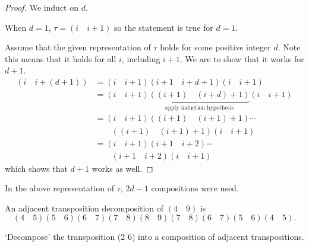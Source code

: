\begin{proof}
    We induct on $d$.

    When $d = 1$, $\tau = (i\quad i+1)$ so the statement is true for $d=1$.

    Assume that the given representation of $\tau$ holds for some positive integer $d$. Note this means that it holds for all $i$, including $i+1$. We are to show that it works for $d + 1$.
    \begin{align*}
        (i\quad i+(d+1)) &= (i\quad i+1)(i+1\quad i+d+1)(i\quad i+1)\\
        &= (i\quad i+1)\underbrace{((i+1)\quad (i+d)+1)}_{\text{apply induction hypothesis}}(i\quad i+1)\\
        &= (i\quad i+1)((i+1)\quad(i+1)+1)\cdots\\
        &\quad\quad((i+1)\quad(i+1)+1)(i\quad i+1)\\
        &= (i\quad i+1)(i+1\quad i+2)\cdots\\
        &\quad\quad(i+1\quad i+2)(i\quad i+1)
    \end{align*}
    which shows that $d+1$ works as well.
\end{proof}
\begin{remark}
    In the above representation of $\tau$, $2d-1$ compositions were used.
\end{remark}
\begin{example}
    An adjacent transposition decomposition of $(4\quad9)$ is
    \[
        (4\quad 5)(5\quad 6)(6\quad 7)(7\quad 8)(8\quad 9)(7\quad 8)(6\quad 7)(5\quad 6)(4\quad 5).
    \]
\end{example}
\begin{exercise}
    `Decompose' the transposition (2 6) into a composition of adjacent transpositions.
\end{exercise}

\newpage

